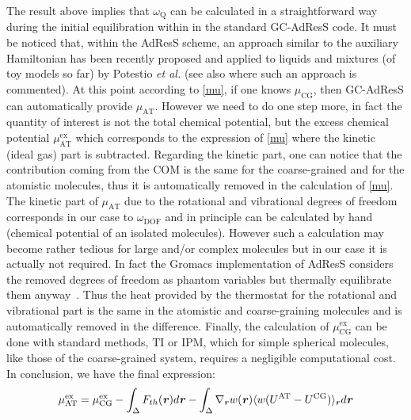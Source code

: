 \documentclass[a4paper,preprint,unsortedaddress]{revtex4-1}
\newcommand{\recheck}[1]{{\color{red} #1}}
\newcommand{\vect}[1]{\textbf{\textit{#1}}}
\newcommand{\dof}{{\textrm{DOF}}}
\newcommand{\AT}{{\textrm{{AT}}}}
\newcommand{\CG}{{\textrm{CG}}}
\newcommand{\exc}{{\textrm{ex}}}
\newcommand{\thermo}{{\textrm{Q}}}
\begin{document}
The result above implies that $\omega_{\thermo}$ can be calculated in a straightforward way during the initial equilibration within in the standard GC-AdResS code. 
\recheck{It must be noticed that, within the AdResS scheme, an approach similar to the auxiliary Hamiltonian  has been recently proposed and applied to liquids and mixtures (of toy models so far) by Potestio {\it et al.} \cite{h-adress-0, h-adress} (see also \cite{luigientropy} where such an approach is commented)}. At this point according to \eqref{mu}, if one knows $\mu_{\CG}$, then  GC-AdResS can automatically provide $\mu_{\AT}$. However we need to do one step more, in fact the quantity of interest is not the total chemical potential, but the excess chemical potential $\mu^{\exc}_{\AT}$ which corresponds to the expression of \eqref{mu} where the kinetic (ideal gas) part is subtracted. Regarding the kinetic part, one can notice that the contribution coming from the COM is the same for the coarse-grained and for the atomistic molecules, thus it is automatically removed in the calculation of \eqref{mu}.
The kinetic part of $\mu_{\AT}$ due to the rotational and vibrational degrees of freedom corresponds in our case to $\omega_{\dof}$ and \recheck{in principle can be calculated by hand (chemical potential of an isolated molecules). However such a calculation may become rather tedious for large and/or complex molecules but in our case it is actually not required.} In fact the \recheck{Gromacs implementation of AdResS} considers the removed degrees of freedom as phantom variables but thermally equilibrate them anyway~\cite{simon-ch}. Thus the heat provided by the thermostat for the rotational and vibrational part is the same in the atomistic and coarse-graining molecules and is automatically removed in the difference. Finally, the calculation of $\mu^{\exc}_{\CG}$ can be done with standard methods, TI or IPM, which for simple spherical molecules, like those of the coarse-grained system, requires a negligible computational cost.
In conclusion, we have the final expression:
\begin{equation}
  \mu^{\exc}_{\AT}=
  \mu^{\exc}_{\CG}-
  \int_{\Delta}{F}_{th}({\vect r})d{\vect r}-
  \int_{\Delta}\nabla_{\vect r} w(\vect r) \langle w(U^{\AT}-U^{\CG})\rangle_{\vect r} d{\vect r}
\label{finalmu}
\end{equation}
\end{document}

